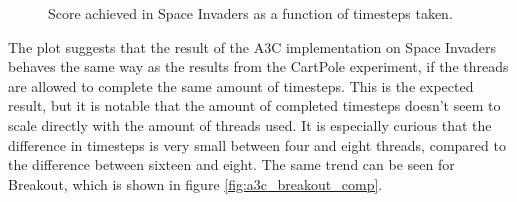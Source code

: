 \documentclass[11pt]{article}
\begin{document}
\begin{figure}[H]
    \caption{Score achieved in Space Invaders as a function of
    timesteps taken.}
    \label{fig:a3c_spaceinvaders_ts}
\end{figure}

The plot suggests that the result of the A3C implementation
on Space Invaders behaves the same way as the results from the CartPole experiment,
if the threads are allowed to complete the same amount of timesteps.
This is the expected result, but it is notable that the amount
of completed timesteps doesn't seem to scale directly with
the amount of threads used.
It is especially curious that the difference in timesteps is very small
between four and eight threads, compared to the difference between sixteen and eight.
The same trend can be seen for Breakout, which is shown in figure
\ref{fig:a3c_breakout_comp}.
\end{document}
